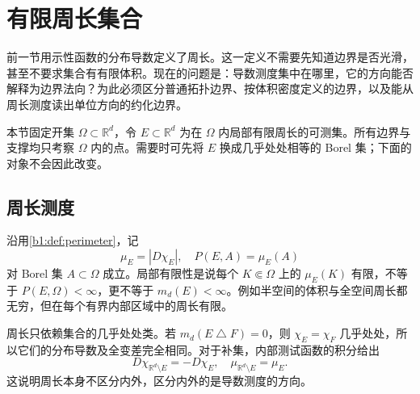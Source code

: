 \section{有限周长集合}
\label{b1:sec:2704}

前一节用示性函数的分布导数定义了周长。这一定义不需要先知道边界是否光滑，甚至不要求集合有有限体积。现在的问题是：导数测度集中在哪里，它的方向能否解释为边界法向？为此必须区分普通拓扑边界、按体积密度定义的边界，以及能从周长测度读出单位方向的约化边界。

\ProseParagraphBreak

本节固定开集 \(\Omega\subset\mathbb R^d\)，令 \(E\subset\mathbb R^d\) 为在 \(\Omega\) 内局部有限周长的可测集。所有边界与支撑均只考察 \(\Omega\) 内的点。需要时可先将 \(E\) 换成几乎处处相等的 Borel 集；下面的对象不会因此改变。


\subsection{周长测度}
\label{b1:subsec:270401}

沿用\cref{b1:def:perimeter}，记
\[
 \mu_E=|D\chi_E|,\quad P(E,A)=\mu_E(A)
\]
对 Borel 集 \(A\subset\Omega\) 成立。局部有限性是说每个 \(K\Subset\Omega\) 上的 \(\mu_E(K)\) 有限，不等于 \(P(E,\Omega)<\infty\)，更不等于 \(m_d(E)<\infty\)。例如半空间的体积与全空间周长都无穷，但在每个有界内部区域中的周长有限。

\ProseParagraphBreak

周长只依赖集合的几乎处处类。若 \(m_d(E\mathbin{\triangle}F)=0\)，则 \(\chi_E=\chi_F\) 几乎处处，所以它们的分布导数及全变差完全相同。对于补集，内部测试函数的积分给出
\begin{equation}\label{b1:eq:perimeter-complement}
 D\chi_{\mathbb R^d\setminus E}=-D\chi_E,\quad
 \mu_{\mathbb R^d\setminus E}=\mu_E.
\end{equation}
这说明周长本身不区分内外，区分内外的是导数测度的方向。

